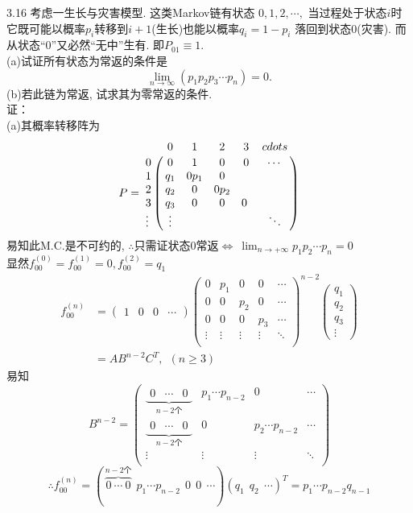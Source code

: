 3.16 考虑一生长与灾害模型. 这类Markov链有状态 $0,1,2,\cdots,$ 当过程处于状态$i$时它既可能以概率$p_i$转移到$i+1$(生长)也能以概率$q_i = 1 - p_i$ 落回到状态$0$(灾害). 而从状态“0”又必然“无中”生有. 即$P_{01} \equiv 1$.\\
(a)试证所有状态为常返的条件是
\[
\lim_{n \rightarrow \infty}(p_1p_2p_3\cdots p_n) = 0.
\]
(b)若此链为常返, 试求其为零常返的条件.\\
证：\\
(a)其概率转移阵为
\[
P = 
\bordermatrix{
	~ & 0 & 1 & 2 & 3 & cdots \cr
	0 & 0 & 1 & 0 & 0 & \cdots \cr
	1 & q_1 & 0 p_1 & 0 & ~ \cr
	2 & q_2 & 0 & 0 p_2 & ~ \cr
	3 & q_3 & 0 & 0 & 0 ~ \cr
	\vdots & \vdots & ~ & ~ & ~ & \ddots \cr
}
\]
易知此M.C.是不可约的, $\therefore$只需证状态$0$常返$\Leftrightarrow~\lim_{n\rightarrow +\infty}p_1p_2\cdots p_n = 0$\\
显然$f^{(0)}_{00} = f^{(1)}_{00} = 0, f^{(2)}_{00} = q_1$
\[
\begin{split}
f^{(n)}_{00} & = 
\begin{pmatrix}
1 & 0 & 0 & \cdots
\end{pmatrix}
\begin{pmatrix}
0 & p_1 & 0 & 0 & \cdots\\
0 & 0 & p_2 & 0 & \cdots\\
0 & 0 & 0 & p_3 & \cdots\\
\vdots & \vdots & \vdots & \vdots & \ddots\\
\end{pmatrix}^{n-2}
\begin{pmatrix}
q_1\\
q_2\\
q_3\\
\vdots
\end{pmatrix}\\
& = AB^{n-2}C^T, ~~(n\geqslant 3)
\end{split}
\]
易知
\[
B^{n-2} = 
\begin{pmatrix}
\underbrace{\begin{matrix}0 & \cdots & 0\end{matrix}}_{n-2\text{个}} & p_1\cdots p_{n-2} & 0 & \cdots \\
\underbrace{\begin{matrix}0 & \cdots & 0\end{matrix}}_{n-2\text{个}} & 0 & p_2\cdots p_{n-2} & \cdots \\
\vdots & \vdots & \vdots & \ddots\\
\end{pmatrix}
\]
\[
\therefore f^{(n)}_{00} = (\,\overbrace{0~\cdots~0}^{n-2\text{个}}~~p_1\cdots p_{n-2}~~0~~0~~\cdots)(q_1~~q_2~~\cdots)^T = p_1\cdots p_{n-2}q_{n-1}
\]
